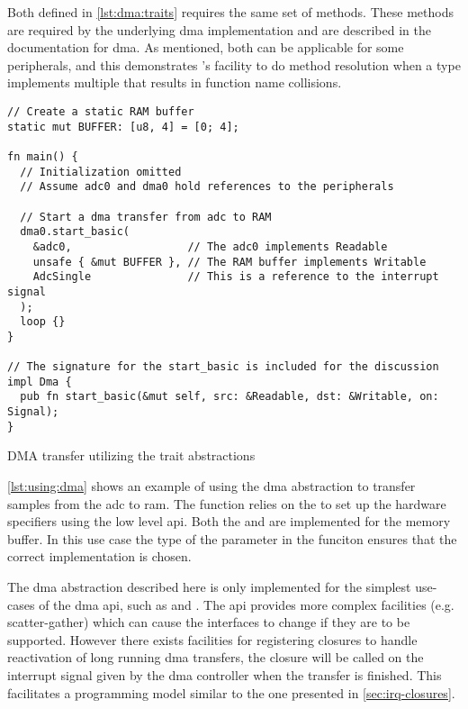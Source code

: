 Both  defined in \autoref{lst:dma:traits} requires the same set of methods.
These methods are required by the underlying \gls{dma} implementation and are described in the {\emlib} documentation for \gls{dma}.
As mentioned, both  can be applicable for some peripherals, and this demonstrates {\rust}'s facility to do method resolution when a type implements multiple  that results in function name collisions.

\begin{listing}[H]
  \begin{verbatim}
// Create a static RAM buffer
static mut BUFFER: [u8, 4] = [0; 4];

fn main() {
  // Initialization omitted
  // Assume adc0 and dma0 hold references to the peripherals

  // Start a dma transfer from adc to RAM
  dma0.start_basic(
    &adc0,                  // The adc0 implements Readable
    unsafe { &mut BUFFER }, // The RAM buffer implements Writable
    AdcSingle               // This is a reference to the interrupt signal
  );
  loop {}
}

// The signature for the start_basic is included for the discussion
impl Dma {
  pub fn start_basic(&mut self, src: &Readable, dst: &Writable, on: Signal);
}
  \end{verbatim}
  \caption{DMA transfer utilizing the trait abstractions}
  \label{lst:using:dma}
\end{listing}

\autoref{lst:using:dma} shows an example of using the \gls{dma} abstraction to transfer samples from the \gls{adc} to \gls{ram}.
The  function relies on the  to set up the hardware specifiers using the low level \gls{api}.
Both the  and   are implemented for the memory buffer.
In this use case the type of the  parameter in the  funciton ensures that the correct implementation is chosen.

The \gls{dma} abstraction described here is only implemented for the simplest use-cases of the {\emlib} \gls{dma} \gls{api}, such as  and .
The {\emlib} \gls{api} provides more complex facilities (e.g. scatter-gather) which can cause the interfaces to change if they are to be supported.
However there exists facilities for registering closures to handle reactivation of long running \gls{dma} transfers, the closure will be called on the interrupt signal given by the \gls{dma} controller when the transfer is finished.
This facilitates a programming model similar to the one presented in \autoref{sec:irq-closures}.

